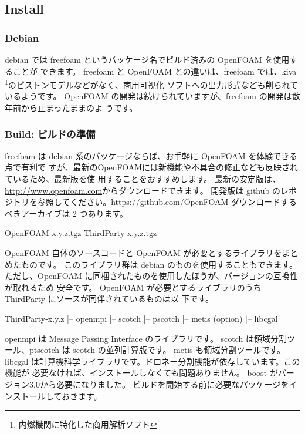\documentclass[mingoth,a4paper]{jsarticle}
\begin{document}
\subsection{Install}

\subsubsection{Debian}
debian では freefoam というパッケージ名でビルド済みの OpenFOAM を使用することが
できます。
freefoam と OpenFOAM との違いは、freefoam では、kiva%
\footnote{内燃機関に特化した商用解析ソフト}のピストンモデルなどがなく、商用可視化
ソフトへの出力形式なども削られているようです。
OpenFOAM の開発は続けられていますが、freefoam の開発は数年前から止まったままのよ
うです。

\subsubsection{Build: ビルドの準備}
freefoam は debian 系のパッケージならば、お手軽に OpenFOAM を体験できる点で有利で
すが、最新のOpenFOAMには新機能や不具合の修正なども反映されているため、最新版を使
用することをおすすめします。
最新の安定版は、\url{http://www.openfoam.com}からダウンロードできます。
開発版は github のレポジトリを参照してください。\url{https://github.com/OpenFOAM}
ダウンロードするべきアーカイブは 2 つあります。

\begin{commandline}
OpenFOAM-x.y.z.tgz
ThirdParty-x.y.z.tgz
\end{commandline}

OpenFOAM 自体のソースコードと OpenFOAM が必要とするライブラリをまとめたものです。
このライブラリ群は debian のものを使用することもできます。
ただし、OpenFOAM に同梱されたものを使用したほうが、バージョンの互換性が取れるため
安全です。
OpenFOAM が必要とするライブラリのうち ThirdParty にソースが同伴されているものは以
下です。

\begin{commandline}
ThirdParty-x.y.z
 |-- openmpi
 |-- scotch
 |-- pscotch
 |-- metis (option)
 |-- libcgal
\end{commandline}

openmpi は Message Passing Interface のライブラリです。
scotch は領域分割ツール、ptscotch は scotch の並列計算版です。
metis も領域分割ツールです。
libcgal は計算機科学ライブラリです。ドロネー分割機能が依存しています。この機能が
必要なければ、インストールしなくても問題ありません。
boost がバージョン3.0から必要になりました。
ビルドを開始する前に必要なパッケージをインストールしておきます。
\end{document}
